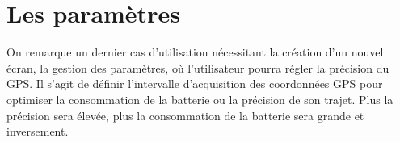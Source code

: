 \section{Les paramètres}
On remarque un dernier cas d'utilisation nécessitant la création d'un nouvel écran, la gestion des paramètres, où l'utilisateur pourra régler la précision du GPS. Il s'agit de définir l'intervalle d'acquisition des coordonnées GPS pour optimiser la consommation de la batterie ou la précision de son trajet. Plus la précision sera élevée, plus la consommation de la batterie sera grande et inversement.
 